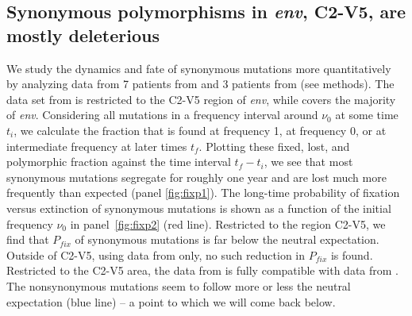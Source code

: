\documentclass[rmp, twocolumn]{revtex4}
\newcommand{\pfix}{P_{fix}}
\newcommand{\env}{\textit{env}}
\begin{document}
\subsection{Synonymous polymorphisms in \env, C2-V5, are mostly deleterious}
We study the dynamics and fate of synonymous mutations more quantitatively by
analyzing data from 7 patients from
\citet{shankarappa_consistent_1999,liu_selection_2006} and 3 patients from
\citet{bunnik_autologous_2008} (see methods). The data set from
\citet{shankarappa_consistent_1999,liu_selection_2006} is restricted to the
C2-V5 region of \env, while \citet{bunnik_autologous_2008} covers the
majority of \env. Considering all mutations in a
frequency interval around $\nu_0$ at some time $t_i$, we calculate the fraction
that is found at frequency 1, at frequency 0, or at intermediate frequency at
later times $t_f$. Plotting these fixed, lost, and polymorphic fraction against
the time interval $t_f-t_i$, we see that most synonymous mutations segregate for
roughly one year and are lost much more frequently than expected (panel
\ref{fig:fixp1}). The long-time probability of fixation versus extinction of
synonymous mutations is shown as a function of the initial frequency $\nu_0$ in
panel~\ref{fig:fixp2} (red line). Restricted to the region C2-V5, we find that
$\pfix$ of synonymous mutations is far below the neutral expectation.
Outside of C2-V5, using data from \citet{bunnik_autologous_2008} only, no such
reduction in $\pfix$ is found. Restricted to the C2-V5 area, the data from
\citet{bunnik_autologous_2008} is fully compatible with data from
\citet{shankarappa_consistent_1999}. The nonsynonymous mutations seem to follow
more or less the neutral expectation (blue line) -- a point to which we will come back below.
\end{document}
